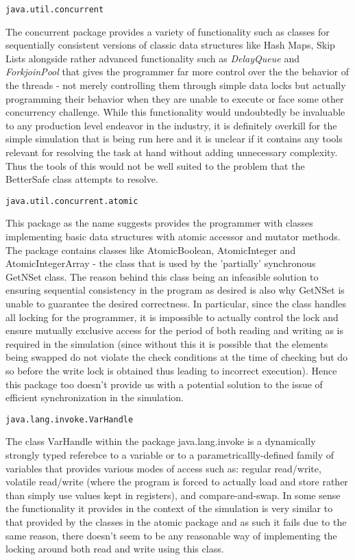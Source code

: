 \begin{verbatim}
java.util.concurrent
\end{verbatim}
The concurrent package provides a variety of functionality such as classes for sequentially consistent versions of classic data structures like Hash Maps, Skip Lists alongside rather advanced functionality such as \emph{DelayQueue} and \emph{ForkjoinPool} that gives the programmer far more control over the the behavior of the threads - not merely controlling them through simple data locks but actually programming their behavior when they are unable to execute or face some other concurrency challenge.
While this functionality would undoubtedly be invaluable to any production level endeavor in the industry, it is definitely overkill for the simple simulation that is being run here and it is unclear if it contains any tools relevant for resolving the task at hand without adding unnecessary complexity. Thus the tools of this would not be well suited to the problem that the BetterSafe class attempts to resolve. 

\begin{verbatim}
java.util.concurrent.atomic
\end{verbatim}
This package as the name suggests provides the programmer with classes implementing basic data structures with atomic accessor and mutator methods. The package contains classes like AtomicBoolean, AtomicInteger and AtomicIntegerArray - the class that is used by the 'partially' synchronous GetNSet class. The reason behind this class being an infeasible solution to ensuring sequential consistency in the program as desired is also why GetNSet is unable to guarantee the desired correctness. In particular, since the class handles all locking for the programmer, it is impossible to actually control the lock and ensure mutually exclusive access for the period of both reading and writing as is required in the simulation (since without this it is possible that the elements being swapped do not violate the check conditions at the time of checking but do so before the write lock is obtained thus leading to incorrect execution). 
Hence this package too doesn't provide us with a potential solution to the issue of efficient synchronization in the simulation. 

\begin{verbatim}
java.lang.invoke.VarHandle
\end{verbatim}
The class VarHandle within the package java.lang.invoke is a dynamically strongly typed referebce to a variable or to a parametricallly-defined family of variables that provides various modes of access such as: regular read/write, volatile read/write (where the program is forced to actually load and store rather than simply use values kept in registers), and compare-and-swap. In some sense the functionality it provides in the context of the simulation is very similar to that provided by the classes in the atomic package and as such it fails due to the same reason, there doesn't seem to be any reasonable way of implementing the locking around both read and write using this class. 

